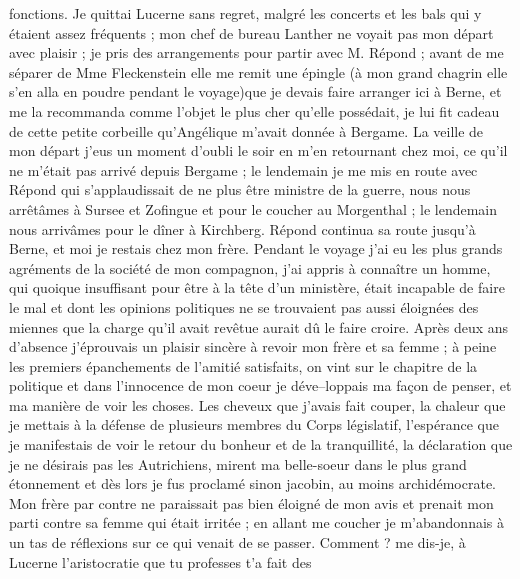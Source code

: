 \documentclass[12pt]{article}
\begin{document}
 fonctions. Je quittai Lucerne sans regret, malgré
les concerts et les bals qui y étaient assez fréquents ; mon chef de bureau Lanther ne voyait pas
mon départ avec plaisir ; je pris des arrangements pour partir avec M. Répond ; avant de me séparer
de Mme Fleckenstein elle me remit une épingle (à mon grand chagrin elle s’en alla en poudre pendant
le voyage)que je devais faire arranger ici à Berne, et me la recommanda comme l’objet le plus cher
qu’elle possédait, je lui fit cadeau de cette petite corbeille qu’Angélique m’avait donnée à
Bergame. La veille de mon départ j’eus un moment d’oubli le soir en m’en retournant chez moi, ce
qu’il ne m’était pas arrivé depuis Bergame ; le lendemain je me mis en route avec Répond qui
s’applaudissait de ne plus être ministre de la guerre, nous nous arrêtâmes à Sursee et Zofingue et
pour le coucher au Morgenthal ; le lendemain nous arrivâmes pour le dîner à Kirchberg. Répond
continua sa route jusqu’à Berne, et moi je restais chez mon frère. Pendant le voyage j’ai eu les
plus grands agréments de la société de mon compagnon, j’ai appris à connaître un homme, qui quoique
insuffisant pour être à la tête d’un ministère, était incapable de faire le mal et dont les opinions
politiques ne se trouvaient pas aussi éloignées des miennes que la charge qu’il avait revêtue aurait
dû le faire croire. Après deux ans d’absence j’éprouvais un plaisir sincère à revoir mon frère et sa
femme ; à peine les premiers épanchements de l’amitié satisfaits, on vint sur le chapitre de la
politique et dans l’innocence de mon coeur je déve–loppais ma façon de penser, et ma manière de voir
les choses. Les cheveux que j’avais fait couper, la chaleur que je mettais à la défense de plusieurs
membres du Corps législatif, l’espérance que je manifestais de voir le retour du bonheur et de la
tranquillité, la déclaration que je ne désirais pas les Autrichiens, mirent ma belle-soeur dans le
plus grand étonnement et dès lors je fus proclamé sinon jacobin, au moins archidémocrate. Mon frère
par contre ne paraissait pas bien éloigné de mon avis et prenait mon parti contre sa femme qui était
irritée ; en allant me coucher je m’abandonnais à un tas de réflexions sur ce qui venait de se
passer. Comment ? me dis-je, à Lucerne l’aristocratie que tu professes t’a fait des
\end{document}
